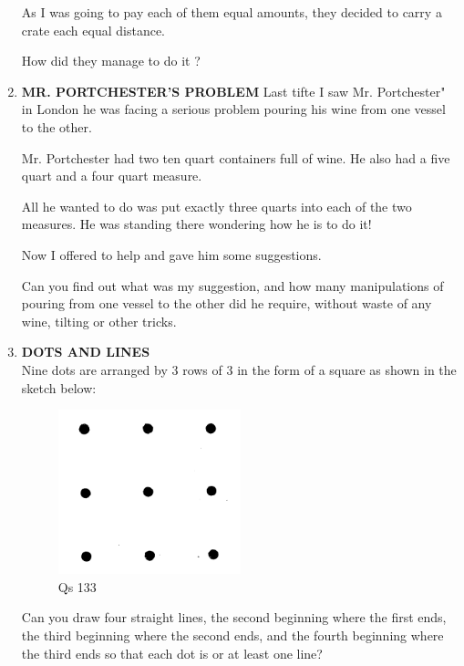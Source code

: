 \documentclass[12pt]{article}
\begin{document}
\begin{enumerate}
As I was  going  to pay  each  of them  equal  amounts, they decided  to carry  a crate  each  equal  distance. 

How  did they  manage  to do it ? 

\item \textbf{MR.  PORTCHESTER'S  PROBLEM} 
Last tifte  I saw  Mr.  Portchester"  in London  he was facing  a serious  problem  pouring  his wine  from  one vessel to the other. 

Mr. Portchester  had  two  ten  quart  containers  full of wine.  He  also  had a five  quart  and  a four  quart measure. 

All he wanted  to do was  put exactly  three  quarts  into each of the  two  measures.  He  was  standing  there wondering  how  he is to do it! 

Now  I offered  to help  and gave  him  some  suggestions. 

Can you find  out what  was  my  suggestion,  and how many  manipulations  of pouring  from  one  vessel  to the other  did he require,  without  waste  of any wine,  tilting  or other  tricks. 


\item \textbf{DOTS  AND  LINES} \\
Nine  dots  are  arranged  by 3 rows  of 3 in the form  of 
a square  as shown  in the sketch  below: 

\begin{figure}[h]
\begin{center}
\includegraphics[width=0.5\textwidth]{sdevi_q133.png}
\caption{ Qs 133}
\end{center}
\end{figure}


Can you  draw  four  straight  lines,  the second  beginning where  the first  ends,  the third  beginning  where  the second ends,  and the fourth  beginning  where  the  third  ends  so that each  dot is or at least  one line? 



\end{enumerate}
\end{document}
